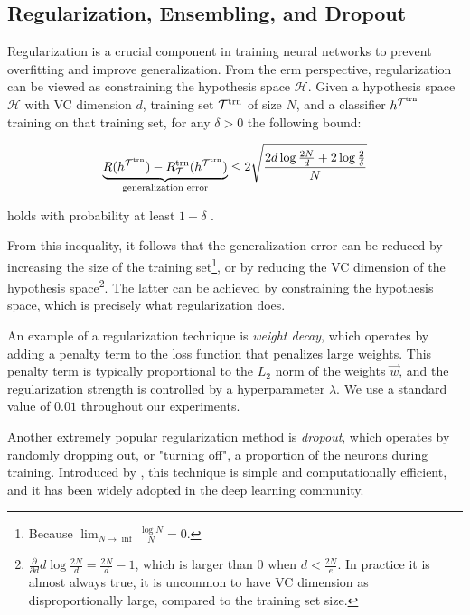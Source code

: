 \subsection{Regularization, Ensembling, and Dropout}
\label{sec:dropout}

Regularization is a crucial component in training neural networks to prevent overfitting and improve generalization.
From the \gls{erm} perspective, regularization can be viewed as constraining the hypothesis space $\mathcal{H}$.
Given a hypothesis space $\mathcal{H}$ with VC dimension $d$, training set $\mathcal{T}^\text{trn}$ of size $N$, and a classifier
$h^{\mathcal{T}^\text{trn}}$ training on that training set, for any $\delta > 0$ the following bound:

\begin{equation}
    \label{eq:generalization}
    \underbrace{R(h^{\mathcal{T}^\text{trn}}) - R_\mathcal{T}^\text{trn}(h^{\mathcal{T}^\text{trn}})}_\text{generalization error}
    \leq 2\sqrt{\frac{2 d \log \frac{2N}{d} + 2 \log \frac{2}{\delta}}{N}}
\end{equation}

holds with probability at least $1 - \delta$ \cite{generalization-bound}.

From this inequality, it follows that the generalization error can be reduced by increasing the size of the training
set\footnote{\vspace{5pt}Because $\lim_{N \rightarrow \inf}\frac{\log N}{N} = 0$.}, or by reducing the VC dimension of the
hypothesis space\footnote{$\frac{\partial}{\partial d} d \log \frac{2N}{d} = \frac{2N}{d} - 1$, which is larger than 0
    when $d < \frac{2N}{e}$. In practice it is almost always true, it is uncommon to have VC dimension as
    disproportionally large, compared to the training set size.}. The latter can be achieved by constraining the
hypothesis space, which is precisely what regularization does.

An example of a regularization technique is \emph{weight decay}, which operates by adding a penalty term to the loss
function that penalizes large weights. This penalty term is typically proportional to the $L_2$ norm of the weights
$\vec{w}$, and the regularization strength is controlled by a hyperparameter $\lambda$. We use a standard value of
$0.01$ throughout our experiments.

Another extremely popular regularization method is \emph{dropout}, which operates by randomly dropping out, or "turning
off", a proportion of the neurons during training. Introduced by \cite{dropout}, this technique is simple and
computationally efficient, and it has been widely adopted in the deep learning community.


